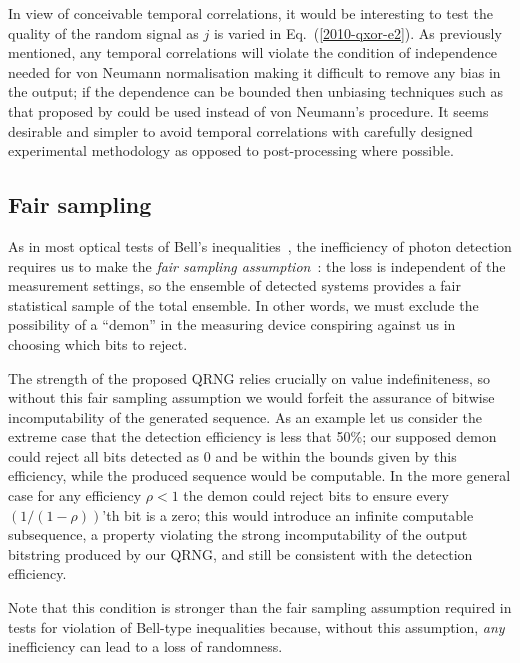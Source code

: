 \documentclass{mscs}
\begin{document}
In view of conceivable temporal correlations, it would be interesting to test the quality of the random signal as $j$ is varied in Eq.~(\ref{2010-qxor-e2}). As previously mentioned, any temporal correlations  will violate the condition of independence needed for von Neumann normalisation making it difficult to remove any bias in the output;  if the dependence can be bounded then unbiasing techniques such as that proposed by \citet{18499} could be used instead of von Neumann's procedure. It seems desirable and simpler to avoid temporal correlations with carefully designed experimental methodology as opposed to post-processing where possible.

\subsection{Fair sampling}

As in most optical tests of Bell's inequalities~\citep{clauser,chau},
the inefficiency of photon detection requires us to make the {\em fair sampling assumption}~\citep{PhysRevD.35.3831,PhysRevA.57.3304,Pearle:1970fk,PhysRevA.81.012109}:  the loss is independent of the measurement settings, so the ensemble of detected systems provides a fair statistical sample of the total ensemble. In other words, we must exclude the possibility of a ``demon'' in the measuring device conspiring against us in choosing which bits to reject.

The strength of the proposed QRNG relies crucially on value indefiniteness,
 so without this fair sampling assumption we would forfeit the assurance of bitwise incomputability of the generated sequence.
As an example let us consider the extreme case that the detection efficiency is less that 50\%;
our supposed demon could reject all bits detected as 0 and be within the bounds given by this efficiency,
while the produced sequence would be computable. In the more general case for any  efficiency $\rho < 1$
 the demon could reject bits to ensure every $\left(1/(1-\rho)\right)$'th bit is a zero;
 this would introduce an infinite computable subsequence, a property violating the strong incomputability of the output bitstring
 produced by our QRNG,
 and still be consistent with the detection efficiency.

Note that this condition is stronger than the fair sampling assumption required in tests for violation of Bell-type inequalities because, without this assumption,  {\it any} inefficiency can lead to a loss of randomness.
\end{document}
